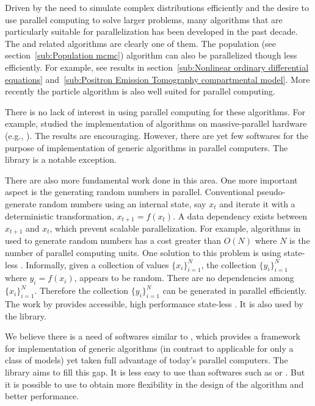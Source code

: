 Driven by the need to simulate complex distributions efficiently and the
desire to use parallel computing to solve larger problems, many algorithms
that are particularly suitable for parallelization has been developed in the
past decade. The \smc and related algorithms are clearly one of them. The
population \mcmc (see section~\ref{sub:Population mcmc}) algorithm can also be
parallelized though less efficiently. For example, see results in
section~\ref{sub:Nonlinear ordinary differential equations}
and~\ref{sub:Positron Emission Tomography compartmental model}. More recently
the particle \mcmc algorithm \cite{Andrieu:2010gc} is also well suited for
parallel computing.

There is no lack of interest in using parallel computing for these algorithms.
For example, \cite{Lee:2010fm} studied the implementation of \smc algorithms
on massive-parallel hardware (e.g., \gpu). The results are encouraging.
However, there are yet few softwares for the purpose of implementation of
generic \smc algorithms in parallel computers. The \libbi library is a notable
exception.

There are also more fundamental work done in this area. One more important
aspect is the generating random numbers in parallel. Conventional pseudo-\rng
generate random numbers using an internal state, say $x_t$ and iterate it with
a deterministic transformation, $x_{t+1} = f(x_t)$. A data dependency exists
between $x_{t+1}$ and $x_t$, which prevent scalable parallelization. For
example, algorithms in \cite{Lee:2010fm} used to generate random numbers has a
cost greater than $O(N)$ where $N$ is the number of parallel computing units.
One solution to this problem is using state-less \rng. Informally, given a
collection of values $\{x_i\}_{i=1}^N$, the collection $\{y_i\}_{i=1}^N$ where
$y_i = f(x_i)$, appears to be random. There are no dependencies among
$\{x_i\}_{i=1}^N$. Therefore the collection $\{y_i\}_{i=1}^N$ can be generated
in parallel efficiently. The work by \cite{Salmon:2011um} provides accessible,
high performance state-less \rng. It is also used by the \vsmc library.

We believe there is a need of softwares similar to \smctc, which provides a
framework for implementation of generic \smc algorithms (in contrast to
applicable for only a class of models) yet taken full advantage of today's
parallel computers. The \vsmc library aims to fill this gap. It is less easy
to use than softwares such as \libbi or \biips. But it is possible to use to
obtain more flexibility in the design of the algorithm and better performance.

